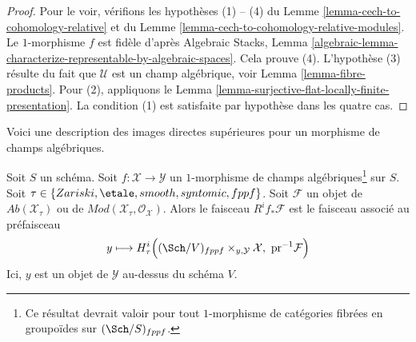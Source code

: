 \begin{proof}
Pour le voir, vérifions les hypothèses (1) -- (4) du
Lemme \ref{lemma-cech-to-cohomology-relative} et du
Lemme \ref{lemma-cech-to-cohomology-relative-modules}.
Le $1$-morphisme $f$ est fidèle d'après
Algebraic Stacks, Lemma
\ref{algebraic-lemma-characterize-representable-by-algebraic-spaces}.
Cela prouve (4).
L'hypothèse (3) résulte du fait que $\mathcal{U}$ est un champ
algébrique, voir
Lemma \ref{lemma-fibre-products}.
Pour (2), appliquons le
Lemma \ref{lemma-surjective-flat-locally-finite-presentation}.
La condition (1) est satisfaite par hypothèse dans les quatre cas.
\end{proof}

\noindent
Voici une description des images directes supérieures pour un
morphisme de champs algébriques.

\begin{lemma}
\label{lemma-pushforward-restriction}
Soit $S$ un schéma. Soit $f : \mathcal{X} \to \mathcal{Y}$ un
$1$-morphisme de champs algébriques\footnote{Ce résultat devrait valoir
pour tout $1$-morphisme de catégories fibrées en groupoïdes sur
$(\Sch/S)_{fppf}$.} sur $S$.
Soit $\tau \in \{Zariski,\linebreak[0] \etale,\linebreak[0]
smooth,\linebreak[0] syntomic,\linebreak[0] fppf\}$.
Soit $\mathcal{F}$
un objet de $\textit{Ab}(\mathcal{X}_\tau)$ ou de
$\textit{Mod}(\mathcal{X}_\tau, \mathcal{O}_\mathcal{X})$.
Alors le faisceau $R^if_*\mathcal{F}$ est le faisceau associé au
préfaisceau
$$
y \longmapsto
H^i_\tau\Big((\Sch/V)_{fppf} \times_{y, \mathcal{Y}} \mathcal{X},
\ \text{pr}^{-1}\mathcal{F}\Big)
$$
Ici, $y$ est un objet de $\mathcal{Y}$ au-dessus du schéma $V$.
\end{lemma}

